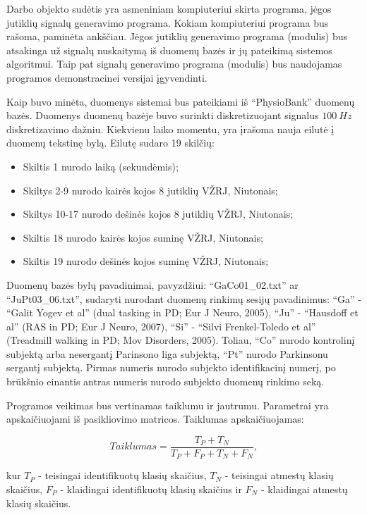 \documentclass[]{vgtuef}
\begin{document}
Darbo objekto sudėtis yra asmeniniam kompiuteriui skirta programa, jėgos jutiklių signalų generavimo programa. Kokiam kompiuteriui programa bus rašoma, paminėta ankščiau. Jėgos jutiklių generavimo programa (modulis) bus atsakinga už signalų nuskaitymą iš duomenų bazės ir jų pateikimą sistemos algoritmui. Taip pat signalų generavimo programa (modulis) bus naudojamas programos demonstracinei versijai įgyvendinti.

Kaip buvo minėta, duomenys sistemai bus pateikiami iš ``PhysioBank'' duomenų bazės. Duomenys duomenų bazėje buvo surinkti diskretizuojant signalus $100~Hz$ diskretizavimo dažniu. Kiekvienu laiko momentu, yra įrašoma nauja eilutė į duomenų tekstinę bylą. Eilutę sudaro 19 skilčių:

\begin{itemize}
\item Skiltis 1 nurodo laiką (sekundėmis);
\item Skiltys 2-9 nurodo kairės kojos 8 jutiklių VŽRJ, Niutonais;
\item Skiltys 10-17 nurodo dešinės kojos 8 jutiklių VŽRJ, Niutonais;
\item Skiltis 18 nurodo kairės kojos suminę VŽRJ, Niutonais;
\item Skiltis 19 nurodo dešinės kojos suminę VŽRJ, Niutonais;
\end{itemize}

Duomenų bazės bylų pavadinimai, pavyzdžiui: ``GaCo01\_02.txt'' ar ``JuPt03\_06.txt'', sudaryti nurodant duomenų rinkimų sesijų pavadinimus: ``Ga'' - ``Galit Yogev et al'' (dual tasking in PD; Eur J Neuro, 2005), ``Ju'' - ``Hausdoff et al'' (RAS in PD; Eur J Neuro, 2007), ``Si'' - ``Silvi Frenkel-Toledo et al'' (Treadmill walking in PD; Mov Disorders, 2005). Toliau, ``Co'' nurodo kontrolinį subjektą arba nesergantį Parinsono liga subjektą, ``Pt'' nurodo Parkinsonu sergantį subjektą. Pirmas numeris nurodo subjekto identifikacinį numerį, po brūkšnio einantis antras numeris nurodo subjekto duomenų rinkimo seką.

Programos veikimas bus vertinamas taiklumu ir jautrumu. Parametrai yra apskaičiuojami iš pasikliovimo matricos. Taiklumas apskaičiuojamas:

\begin{equation}
Taiklumas = \frac{T_P + T_N}{T_P + F_P + T_N + F_N},
\end{equation}

kur $T_P$ - teisingai identifikuotų klasių skaičius, $T_N$ - teisingai atmestų klasių skaičius, $F_P$ - klaidingai identifikuotų klasių skaičius ir $F_N$ - klaidingai atmestų klasių skaičius.
\end{document}

